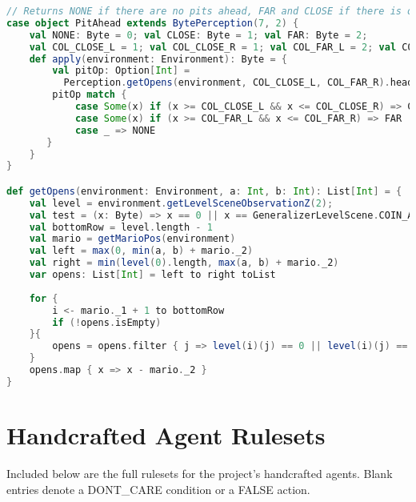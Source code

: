 \begin{appendices}
\begin{minipage}{0.9\linewidth}
\begin{lstlisting}[language=scala, basicstyle=\scriptsize\ttfamily, caption={Pit detection in the perceptions classes.}, label={lst:prcptpit}]
// Returns NONE if there are no pits ahead, FAR and CLOSE if there is one in a certain number of columns relative to mario.
case object PitAhead extends BytePerception(7, 2) {
    val NONE: Byte = 0; val CLOSE: Byte = 1; val FAR: Byte = 2;
    val COL_CLOSE_L = 1; val COL_CLOSE_R = 1; val COL_FAR_L = 2; val COL_FAR_R = 2
    def apply(environment: Environment): Byte = {
        val pitOp: Option[Int] = 
          Perception.getOpens(environment, COL_CLOSE_L, COL_FAR_R).headOption
        pitOp match {
            case Some(x) if (x >= COL_CLOSE_L && x <= COL_CLOSE_R) => CLOSE
            case Some(x) if (x >= COL_FAR_L && x <= COL_FAR_R) => FAR
            case _ => NONE
       }
    }
}

def getOpens(environment: Environment, a: Int, b: Int): List[Int] = {
    val level = environment.getLevelSceneObservationZ(2);
    val test = (x: Byte) => x == 0 || x == GeneralizerLevelScene.COIN_ANIM;
    val bottomRow = level.length - 1
    val mario = getMarioPos(environment)
    val left = max(0, min(a, b) + mario._2)
    val right = min(level(0).length, max(a, b) + mario._2)   
    var opens: List[Int] = left to right toList
    
    for {
        i <- mario._1 + 1 to bottomRow
        if (!opens.isEmpty)
    }{
        opens = opens.filter { j => level(i)(j) == 0 || level(i)(j) == GeneralizerLevelScene.COIN_ANIM }
    }
    opens.map { x => x - mario._2 }
}
\end{lstlisting}
\end{minipage}

\section{Handcrafted Agent Rulesets}
\label{app:har}
\setcounter{table}{0}

Included below are the full rulesets for the project's handcrafted agents. Blank entries denote a {\footnotesize DONT\_CARE} condition or a {\footnotesize FALSE} action.
\vspace{\baselineskip}


\end{appendices}
